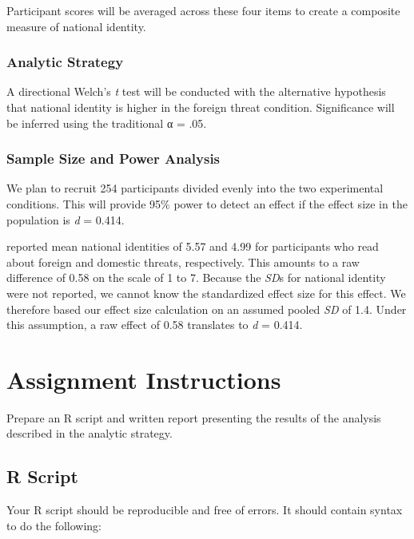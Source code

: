 \documentclass[
]{book}
\begin{document}
Participant scores will be averaged across these four items to create a composite measure of national identity.

\hypertarget{analytic-strategy-2}{%
\subsubsection{Analytic Strategy}\label{analytic-strategy-2}}

A directional Welch's \emph{t} test will be conducted with the alternative hypothesis that national identity is higher in the foreign threat condition. Significance will be inferred using the traditional α = .05.

\hypertarget{sample-size-and-power-analysis-1}{%
\subsubsection{Sample Size and Power Analysis}\label{sample-size-and-power-analysis-1}}

We plan to recruit 254 participants divided evenly into the two experimental conditions. This will provide 95\% power to detect an effect if the effect size in the population is \emph{d} = 0.414.

\citet{davies2008} reported mean national identities of 5.57 and 4.99 for participants who read about foreign and domestic threats, respectively. This amounts to a raw difference of 0.58 on the scale of 1 to 7. Because the \emph{SD}s for national identity were not reported, we cannot know the standardized effect size for this effect. We therefore based our effect size calculation on an assumed pooled \emph{SD} of 1.4. Under this assumption, a raw effect of 0.58 translates to \emph{d} = 0.414.

\hypertarget{ist-assignment}{%
\section{Assignment Instructions}\label{ist-assignment}}

Prepare an R script and written report presenting the results of the analysis described in the analytic strategy.

\hypertarget{r-script-2}{%
\subsection{R Script}\label{r-script-2}}

Your R script should be reproducible and free of errors. It should contain syntax to do the following:
\end{document}
